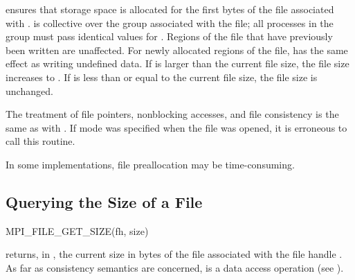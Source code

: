  ensures that storage space is
allocated for the first  bytes of the file
associated with . 
 is collective over the group associated with the file;
all processes in the group must pass identical values for .
Regions of the file that have previously been written are unaffected.
For newly allocated regions of the file, 
has the same effect as writing undefined data.
If  is larger than the current file size,
the file size increases to .
If  is less than or equal to the current file size,
the file size is unchanged.

The treatment of
file pointers, nonblocking accesses, and file consistency
is the same as with .
If  mode was specified when the file was opened,
it is erroneous to call this routine.

\begin{users}
In some implementations,
file preallocation may be time-consuming.
\end{users}

\subsection{Querying the Size of a File}
\label{sec:io-filecntl-get-size}

%
%
\begin{funcdef}{MPI\_FILE\_GET\_SIZE}{(\mbox{fh}, \mbox{size})}
\end{funcdef}

 returns, in ,
the current size in bytes
of the file associated with the file handle .
As far as consistency semantics are concerned,
 is a data access operation
(see ).

